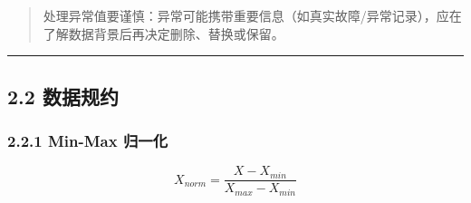 \begin{quote}
处理异常值要谨慎：异常可能携带重要信息（如真实故障/异常记录），应在了解数据背景后再决定删除、替换或保留。
\end{quote}

\begin{center}\rule{0.5\linewidth}{0.5pt}\end{center}

\subsection{2.2 数据规约}\label{ux6570ux636eux89c4ux7ea6}

\subsubsection{2.2.1 Min-Max 归一化}\label{min-max-ux5f52ux4e00ux5316}

\[
X_{norm} = \frac{X - X_{min}}{X_{max} - X_{min}}
\]

\begin{Shaded}
\begin{Highlighting}[]
\OperatorTok{=}\NormalTok{: [}\NormalTok{, }\NormalTok{, }\NormalTok{, }\NormalTok{, }\NormalTok{]\})}
\NormalTok{df[}\NormalTok{] }\OperatorTok{=}\NormalTok{ (df[}\NormalTok{] }\OperatorTok{{-}}\NormalTok{ df[}\NormalTok{].}\NormalTok{()) }\OperatorTok{/}\NormalTok{ (df[}\NormalTok{].}\NormalTok{() }\OperatorTok{{-}}\NormalTok{ df[}\NormalTok{].}\NormalTok{())}
\end{Highlighting}
\end{Shaded}

\begin{Shaded}
\begin{Highlighting}[]
\end{Highlighting}
\end{Shaded}


